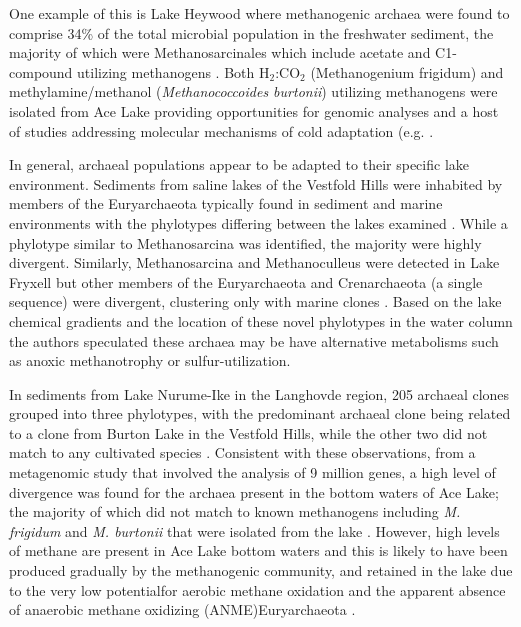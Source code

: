 \documentclass{book}
\begin{document}
One example of this is Lake Heywood where methanogenic archaea were found to comprise 34\% of the total microbial population in the freshwater sediment, 
the majority of which were Methanosarcinales which include acetate and C1-compound utilizing methanogens \cite{Purdy2003}. 
Both H$_2$:CO$_2$ (Methanogenium frigidum) and methylamine/methanol (\textit{Methanococcoides burtonii}) utilizing methanogens were isolated from Ace Lake 
\cite{Franzmann1992, Franmann1997} providing opportunities for genomic analyses \cite{Saunders2003, Allen2009} and a host of studies addressing molecular mechanisms of cold adaptation 
(e.g. \cite{Cavicchioli2006, Williams2011}.

In general, archaeal populations appear to be adapted to their specific lake environment.
Sediments from saline lakes of the Vestfold Hills were inhabited by members of the Euryarchaeota typically found in sediment and marine environments 
with the phylotypes differing between the lakes examined \cite{Bowman2000a}. 
While a phylotype similar to Methanosarcina was identified, the majority were highly divergent. 
Similarly, Methanosarcina and Methanoculleus were detected in Lake Fryxell but other members of the Euryarchaeota and Crenarchaeota (a single sequence) were divergent, 
clustering only with marine clones \cite{Karr2006}. 
Based on the lake chemical gradients and the location of these novel phylotypes in the water column 
the authors speculated these archaea may be have alternative metabolisms such as anoxic methanotrophy or sulfur-utilization. 

In sediments from Lake Nurume-Ike in the Langhovde region, 205 archaeal clones grouped into three phylotypes, 
with the predominant archaeal clone being related to a clone from Burton Lake in the Vestfold Hills, while the other two did not match to any cultivated species \cite{Kurasawa2010}. 
Consistent with these observations, from a metagenomic study that involved the analysis of 9 million genes, a high level of divergence was found for the archaea present in the bottom waters of Ace Lake; 
the majority of which did not match to known methanogens including \textit{M. frigidum} and \textit{M. burtonii} that were isolated from the lake \cite{Lauro2011}. 
However, high levels of methane are present in Ace Lake bottom waters and this is likely to have been produced gradually by the methanogenic community, 
and retained in the lake due to the very low potentialfor aerobic methane oxidation and the apparent absence of anaerobic methane oxidizing (ANME)Euryarchaeota \cite{Lauro2011}.
\end{document}
